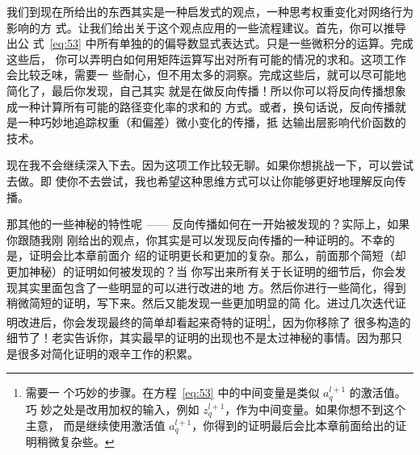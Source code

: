 \begin{center}
\end{center}

我们到现在所给出的东西其实是一种启发式的观点，一种思考权重变化对网络行为影响的方
式。让我们给出关于这个观点应用的一些流程建议。首先，你可以推导出公
式~\eqref{eq:53} 中所有单独的的偏导数显式表达式。只是一些微积分的运算。完成这些后，
你可以弄明白如何用矩阵运算写出对所有可能的情况的求和。这项工作会比较乏味，需要一
些耐心，但不用太多的洞察。完成这些后，就可以尽可能地简化了，最后你发现，自己其实
就是在做反向传播！所以你可以将反向传播想象成一种计算所有可能的路径变化率的求和的
方式。或者，换句话说，反向传播就是一种巧妙地追踪权重（和偏差）微小变化的传播，抵
达输出层影响代价函数的技术。

现在我不会继续深入下去。因为这项工作比较无聊。如果你想挑战一下，可以尝试去做。即
使你不去尝试，我也希望这种思维方式可以让你能够更好地理解反向传播。

那其他的一些神秘的特性呢 —— 反向传播如何在一开始被发现的？实际上，如果你跟随我刚
刚给出的观点，你其实是可以发现反向传播的一种证明的。不幸的是，证明会比本章前面介
绍的证明更长和更加的复杂。那么，前面那个简短（却更加神秘）的证明如何被发现的？当
你写出来所有关于长证明的细节后，你会发现其实里面包含了一些明显的可以进行改进的地
方。然后你进行一些简化，得到稍微简短的证明，写下来。然后又能发现一些更加明显的简
化。进过几次迭代证明改进后，你会发现最终的简单却看起来奇特的证明\footnote{需要一
  个巧妙的步骤。在方程~\eqref{eq:53} 中的中间变量是类似 $a_q^{l+1}$ 的激活值。巧
  妙之处是改用加权的输入，例如 $z^{l+1}_q$，作为中间变量。如果你想不到这个主意，
  而是继续使用激活值
  $a_q^{l+1}$，你得到的证明最后会比本章前面给出的证明稍微复杂些。}，因为你移除了
很多构造的细节了！老实告诉你，其实最早的证明的出现也不是太过神秘的事情。因为那只
是很多对简化证明的艰辛工作的积累。
